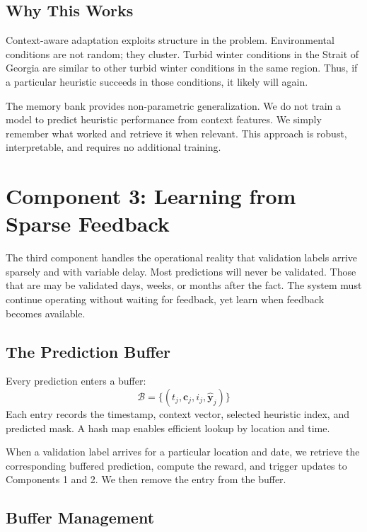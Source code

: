 \documentclass[11pt,a4paper]{article}
\begin{document}
\subsection{Why This Works}

Context-aware adaptation exploits structure in the problem. Environmental conditions are not random; they cluster. Turbid winter conditions in the Strait of Georgia are similar to other turbid winter conditions in the same region. Thus, if a particular heuristic succeeds in those conditions, it likely will again.

The memory bank provides non-parametric generalization. We do not train a model to predict heuristic performance from context features. We simply remember what worked and retrieve it when relevant. This approach is robust, interpretable, and requires no additional training.


\section{Component 3: Learning from Sparse Feedback}
\label{sec:component3}

The third component handles the operational reality that validation labels arrive sparsely and with variable delay. Most predictions will never be validated. Those that are may be validated days, weeks, or months after the fact. The system must continue operating without waiting for feedback, yet learn when feedback becomes available.

\subsection{The Prediction Buffer}

Every prediction enters a buffer:
\[
\mathcal{B} = \{(t_j, \mathbf{c}_j, i_j, \hat{\mathbf{y}}_j)\}
\]
Each entry records the timestamp, context vector, selected heuristic index, and predicted mask. A hash map enables efficient lookup by location and time.

When a validation label arrives for a particular location and date, we retrieve the corresponding buffered prediction, compute the reward, and trigger updates to Components 1 and 2. We then remove the entry from the buffer.

\subsection{Buffer Management}
\end{document}
